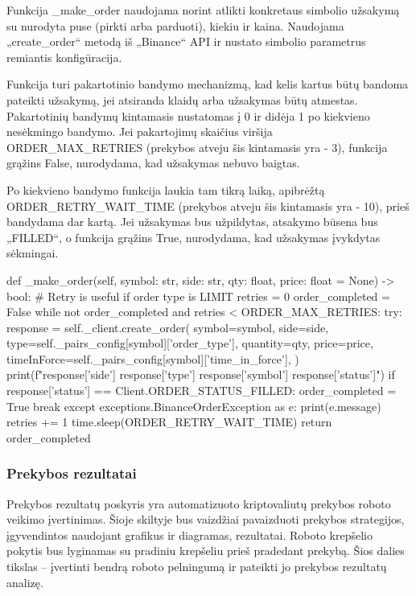 \documentclass{VUMIFInfKursinis}
\begin{document}
Funkcija \_make\_order naudojama norint atlikti konkretaus simbolio užsakymą su nurodyta puse (pirkti arba parduoti), kiekiu ir kaina. Naudojama „create\_order“ metodą iš „Binance“ API ir nustato simbolio parametrus remiantis konfigūracija.

Funkcija turi pakartotinio bandymo mechanizmą, kad kelis kartus būtų bandoma pateikti užsakymą, jei atsiranda klaidų arba užsakymas būtų atmestas. Pakartotinių bandymų kintamasis nustatomas į 0 ir didėja 1 po kiekvieno nesėkmingo bandymo. Jei pakartojimų skaičius viršija ORDER\_MAX\_RETRIES (prekybos atveju šis kintamasis yra - 3), funkcija grąžins False, nurodydama, kad užsakymas nebuvo baigtas.

Po kiekvieno bandymo funkcija laukia tam tikrą laiką, apibrėžtą ORDER\_RETRY\_WAIT\_TIME (prekybos atveju šis kintamasis yra - 10), prieš bandydama dar kartą. Jei užsakymas bus užpildytas, atsakymo būsena bus „FILLED“, o funkcija grąžins True, nurodydama, kad užsakymas įvykdytas sėkmingai.

\begin{python}
  def _make_order(self, symbol: str, side: str, qty: float, price: float = None) -> bool:
  # Retry is useful if order type is LIMIT
  retries = 0
  order_completed = False
  while not order_completed and retries < ORDER_MAX_RETRIES:
  try:
  response = self._client.create_order(
  symbol=symbol,
  side=side,
  type=self._pairs_config[symbol]['order_type'],
  quantity=qty,
  price=price,
  timeInForce=self._pairs_config[symbol]['time_in_force'],
  )
  print(f"{response['side']} {response['type']} {response['symbol']} {response['status']}")
  if response['status'] == Client.ORDER_STATUS_FILLED:
  order_completed = True
  break
  except exceptions.BinanceOrderException as e:
  print(e.message)
  retries += 1
  time.sleep(ORDER_RETRY_WAIT_TIME)
  return order_completed
\end{python}


\subsubsection{Prekybos rezultatai}
Prekybos rezultatų poskyris yra automatizuoto kriptovaliutų prekybos roboto veikimo įvertinimas. Šioje skiltyje bus vaizdžiai pavaizduoti prekybos strategijos, įgyvendintos naudojant grafikus ir diagramas, rezultatai. Roboto krepšelio pokytis bus lyginamas su pradiniu krepšeliu prieš pradedant prekybą. Šios dalies tikslas – įvertinti bendrą roboto pelningumą ir pateikti jo prekybos rezultatų analizę.
\end{document}
